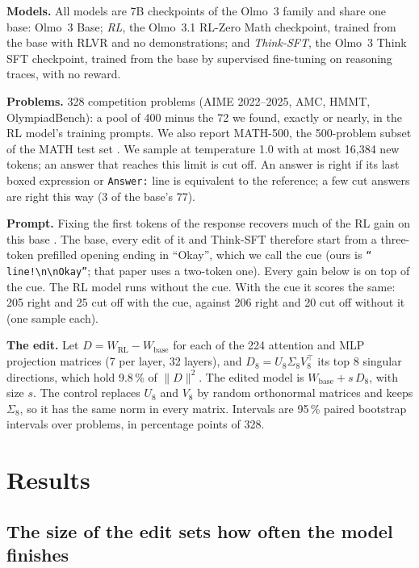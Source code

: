 \documentclass[10pt]{article}
\begin{document}
\textbf{Models.} All models are 7B checkpoints of the Olmo~3 family \cite{ettinger2025olmo} and share one base:
Olmo~3 Base; \emph{RL}, the Olmo~3.1 RL-Zero Math checkpoint, trained from the base with RLVR and no
demonstrations; and \emph{Think-SFT}, the Olmo~3 Think SFT checkpoint, trained from the base by supervised
fine-tuning on reasoning traces, with no reward.

\textbf{Problems.} 328 competition problems (AIME 2022--2025, AMC, HMMT, OlympiadBench): a pool of 400 minus the 72
we found, exactly or nearly, in the RL model's training prompts. We also report MATH-500, the 500-problem subset
\cite{lightman2023lets} of the MATH test set \cite{hendrycks2021measuring}. We sample at temperature 1.0 with at
most 16{,}384 new tokens; an answer that reaches this limit is cut off. An answer is right if its last boxed
expression or \texttt{Answer:} line is equivalent to the reference; a few cut answers are right this way (3 of the
base's 77).

\textbf{Prompt.} Fixing the first tokens of the response recovers much of the RL gain on this base
\cite{wang2026base}. The base, every edit of it and Think-SFT therefore start from a three-token prefilled opening
ending in ``Okay'', which we call the cue (ours is \texttt{`` line!\textbackslash n\textbackslash nOkay''}; that
paper uses a two-token one). Every gain below is on top of the cue. The RL model runs without the cue. With the
cue it scores the same: 205 right and 25 cut off with the cue, against 206 right and 20 cut off without it (one
sample each).

\textbf{The edit.} Let $D = W_{\mathrm{RL}} - W_{\mathrm{base}}$ for each of the 224 attention and MLP projection
matrices (7 per layer, 32 layers), and $D_8 = U_8 \Sigma_8 V_8^{\top}$ its top 8 singular directions, which hold
9.8\,\% of $\|D\|^2$. The edited model is $W_{\mathrm{base}} + s\,D_8$, with size $s$. The control replaces $U_8$
and $V_8$ by random orthonormal matrices and keeps $\Sigma_8$, so it has the same norm in every matrix. Intervals
are 95\,\% paired bootstrap intervals over problems, in percentage points of 328.

\section{Results}

\subsection{The size of the edit sets how often the model finishes}\label{sec:dial}
\end{document}
